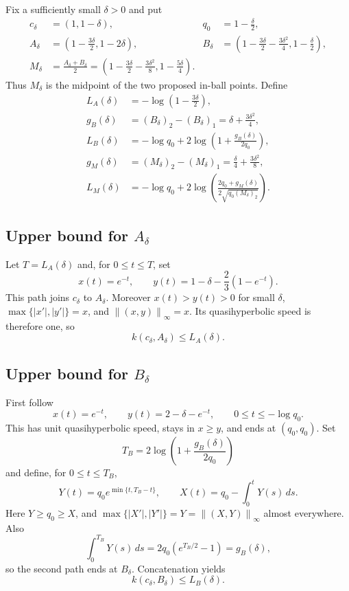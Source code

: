 \documentclass[11pt]{article}
\newcommand{\norm}[1]{\left\lVert#1\right\rVert_\infty}
\begin{document}
Fix a sufficiently small $\delta>0$ and put
\begin{align*}
 c_\delta&=(1,1-\delta),
 &q_0&=1-\frac\delta2,\\
 A_\delta&=\left(1-\frac{3\delta}{2},1-2\delta\right),
 &B_\delta&=\left(1-\frac{3\delta}{2}-\frac{3\delta^2}{4},
                         1-\frac\delta2\right),\\
 M_\delta&=\frac{A_\delta+B_\delta}{2}
 =\left(1-\frac{3\delta}{2}-\frac{3\delta^2}{8},
          1-\frac{5\delta}{4}\right).
\end{align*}
Thus $M_\delta$ is the midpoint of the two proposed in-ball points. Define
\begin{align}
 L_A(\delta)
 &= -\log\left(1-\frac{3\delta}{2}\right),\label{eq:LA}\\
 g_B(\delta)
 &= (B_\delta)_2-(B_\delta)_1
 =\delta+\frac{3\delta^2}{4},\nonumber\\
 L_B(\delta)
 &= -\log q_0+2\log\left(1+\frac{g_B(\delta)}{2q_0}\right),\label{eq:LB}\\
 g_M(\delta)
 &= (M_\delta)_2-(M_\delta)_1
 =\frac\delta4+\frac{3\delta^2}{8},\nonumber\\
 L_M(\delta)
 &= -\log q_0
 +2\log\left(
 \frac{2q_0+g_M(\delta)}
 {2\sqrt{q_0(M_\delta)_2}}
 \right).\label{eq:LM}
\end{align}

\subsection{Upper bound for \texorpdfstring{$A_\delta$}{A-delta}}

Let $T=L_A(\delta)$ and, for $0\leq t\leq T$, set
\[
 x(t)=e^{-t},\qquad
 y(t)=1-\delta-\frac23(1-e^{-t}).
\]
This path joins $c_\delta$ to $A_\delta$.  Moreover $x(t)>y(t)>0$ for
small $\delta$, $\max\{|x'|,|y'|\}=x$, and
$\norm{(x,y)}=x$.  Its quasihyperbolic speed is therefore one, so
\begin{equation}\label{eq:Aupper}
 k(c_\delta,A_\delta)\leq L_A(\delta).
\end{equation}

\subsection{Upper bound for \texorpdfstring{$B_\delta$}{B-delta}}

First follow
\[
 x(t)=e^{-t},\qquad y(t)=2-\delta-e^{-t},
 \qquad 0\leq t\leq-\log q_0.
\]
This has unit quasihyperbolic speed, stays in $x\geq y$, and ends at
$(q_0,q_0)$.  Set
\[
 T_B=2\log\left(1+\frac{g_B(\delta)}{2q_0}\right)
\]
and define, for $0\leq t\leq T_B$,
\[
 Y(t)=q_0e^{\min\{t,T_B-t\}},
 \qquad
 X(t)=q_0-\int_0^tY(s)\,ds.
\]
Here $Y\geq q_0\geq X$, and
$\max\{|X'|,|Y'|\}=Y=\norm{(X,Y)}$ almost everywhere. Also
\[
 \int_0^{T_B}Y(s)\,ds
 =2q_0(e^{T_B/2}-1)=g_B(\delta),
\]
so the second path ends at $B_\delta$. Concatenation yields
\begin{equation}\label{eq:Bupper}
 k(c_\delta,B_\delta)\leq L_B(\delta).
\end{equation}
\end{document}
